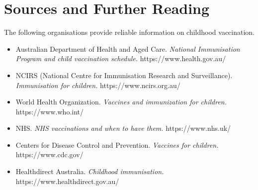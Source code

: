 \section*{Sources and Further Reading}
The following organisations provide reliable information on childhood vaccination.

\begin{itemize}
    \item Australian Department of Health and Aged Care. \textit{National Immunisation Program and child vaccination schedule.} https://www.health.gov.au/
    \item NCIRS (National Centre for Immunisation Research and Surveillance). \textit{Immunisation for children.} https://www.ncirs.org.au/
    \item World Health Organization. \textit{Vaccines and immunization for children.} https://www.who.int/
    \item NHS. \textit{NHS vaccinations and when to have them.} https://www.nhs.uk/
    \item Centers for Disease Control and Prevention. \textit{Vaccines for children.} https://www.cdc.gov/
    \item Healthdirect Australia. \textit{Childhood immunisation.} https://www.healthdirect.gov.au/
\end{itemize}
